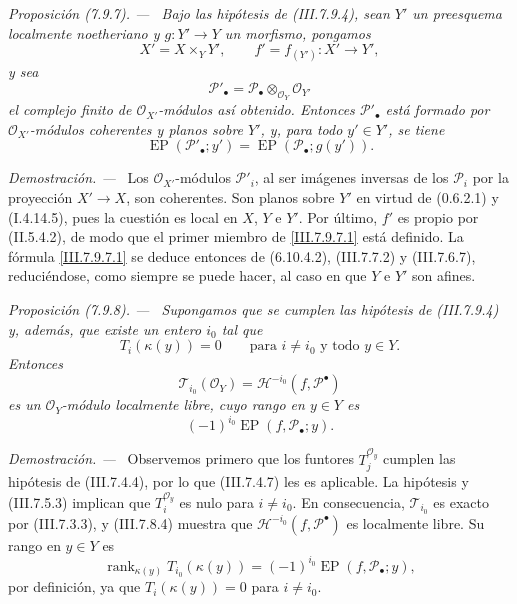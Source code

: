 \documentclass[10pt,oneside]{book}
\newcommand{\kres}{\kappa}
\newcommand{\sref}[2][]{\textup{(#2)}}
\newenvironment{proposition}[1][]{\par\medskip\noindent\itshape Proposición (#1). ---\ }{\par}
\newenvironment{proof}{\par\medskip\noindent\textit{Demostración. ---\ }}{\par}
\providecommand{\setmin}{-}%
\begin{document}
\begin{proposition}[7.9.7]
\label{III.7.9.7}
Bajo las hipótesis de \textup{\sref{III.7.9.4}}, sean $Y'$ un preesquema
localmente noetheriano y $g:Y'\to Y$ un morfismo, pongamos
\[
  X'=X\times_Y Y',\qquad
  f'=f_{(Y')}:X'\longrightarrow Y',
\]
y sea
\[
  \mathscr P'_\bullet
  =
  \mathscr P_\bullet\otimes_{\mathscr O_Y}\mathscr O_{Y'}
\]
el complejo finito de $\mathscr O_{X'}$-módulos así obtenido.
Entonces $\mathscr P'_\bullet$ está formado por
$\mathscr O_{X'}$-módulos coherentes y planos sobre $Y'$, y, para
todo $y'\in Y'$, se tiene
\[
  \operatorname{EP}(\mathscr P'_\bullet;y')
  =
  \operatorname{EP}(\mathscr P_\bullet;g(y')).
  \tag{7.9.7.1}\label{III.7.9.7.1}
\]
\end{proposition}

\begin{proof}
Los $\mathscr O_{X'}$-módulos $\mathscr P'_i$, al ser imágenes
inversas de los $\mathscr P_i$ por la proyección $X'\to X$, son
coherentes. Son planos sobre $Y'$ en virtud de
\sref[0]{0.6.2.1} y \sref[I]{I.4.14.5}, pues la cuestión es local
en $X$, $Y$ e $Y'$. Por último, $f'$ es propio por
\sref[II]{II.5.4.2}, de modo que el primer miembro de
\eqref{III.7.9.7.1} está definido. La fórmula
\eqref{III.7.9.7.1} se deduce entonces de
\textup{(6.10.4.2)}, \sref{III.7.7.2} y
\sref{III.7.6.7}, reduciéndose, como siempre se puede hacer, al
caso en que $Y$ e $Y'$ son afines.
\end{proof}

\begin{proposition}[7.9.8]
\label{III.7.9.8}
Supongamos que se cumplen las hipótesis de \textup{\sref{III.7.9.4}} y,
además, que existe un entero $i_0$ tal que
\[
  T_i(\kres(y))=0
  \qquad\text{para $i\neq i_0$ y todo $y\in Y$.}
\]
Entonces
\[
  \mathscr T_{i_0}(\mathscr O_Y)
  =
  \mathscr H^{-i_0}(f,\mathscr P^\bullet)
\]
es un $\mathscr O_Y$-módulo localmente libre, cuyo rango en
$y\in Y$ es
\[
  (\setmin 1)^{i_0}\operatorname{EP}(f,\mathscr P_\bullet;y).
\]
\end{proposition}

\begin{proof}
Observemos primero que los funtores
$T_j^{\mathscr O_y}$ cumplen las hipótesis de
\sref{III.7.4.4}, por lo que \sref{III.7.4.7} les es aplicable.
La hipótesis y \sref{III.7.5.3} implican que
$T_i^{\mathscr O_y}$ es nulo para $i\neq i_0$.
En consecuencia, $\mathscr T_{i_0}$ es exacto por
\sref{III.7.3.3}, y \sref{III.7.8.4} muestra que
$\mathscr H^{-i_0}(f,\mathscr P^\bullet)$ es localmente libre.
Su rango en $y\in Y$ es
\[
  \operatorname{rank}_{\kres(y)}
    T_{i_0}(\kres(y))
  =
  (\setmin 1)^{i_0}\operatorname{EP}(f,\mathscr P_\bullet;y),
\]
por definición, ya que $T_i(\kres(y))=0$ para
$i\neq i_0$.
\end{proof}
\end{document}
